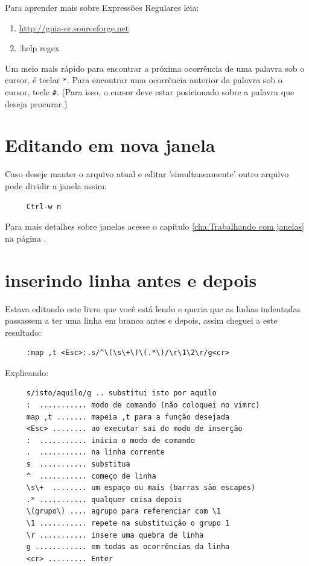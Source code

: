 \documentclass[10pt,a4paper,openany]{book}
\begin{document}
Para aprender mais sobre Expressões Regulares leia:

\begin{enumerate}
  \item \url{http://guia-er.sourceforge.net}
  \item :help regex
\end{enumerate}

Um meio mais rápido para encontrar a próxima ocorrência de
uma palavra sob o cursor, é teclar \verb|*|. Para encontrar uma ocorrência
anterior da palavra sob o cursor, tecle \verb|#|. (Para isso, o cursor deve
estar posicionado sobre a palavra que deseja procurar.)

\section{Editando em nova janela}\label{Editando em nova janela}

Caso deseje manter o arquivo atual e editar 'simultaneamente' outro arquivo
pode dividir a janela assim:

\begin{verbatim}
     Ctrl-w n
\end{verbatim}

Para mais detalhes sobre janelas acesse o capítulo
\ref{cha:Trabalhando com janelas} na página \pageref{cha:Trabalhando
com janelas}.


\section{inserindo linha antes e depois}

Estava editando este livro que você está lendo e queria que as linhas
indentadas passassem a ter uma linha em branco antes e depois, assim cheguei a
este resultado:

\begin{verbatim}
     :map ,t <Esc>:.s/^\(\s\+\)\(.*\)/\r\1\2\r/g<cr>
\end{verbatim}
     
     Explicando:
     
\begin{verbatim}
     s/isto/aquilo/g .. substitui isto por aquilo
     :  ........... modo de comando (não coloquei no vimrc)
     map ,t ....... mapeia ,t para a função desejada
     <Esc> ........ ao executar sai do modo de inserção
     :  ........... inicia o modo de comando
     .  ........... na linha corrente
     s  ........... substitua
     ^  ........... começo de linha
     \s\+  ........ um espaço ou mais (barras são escapes)
     .* ........... qualquer coisa depois
     \(grupo\) .... agrupo para referenciar com \1
     \1 ........... repete na substituição o grupo 1
     \r ........... insere uma quebra de linha
     g ............ em todas as ocorrências da linha
     <cr> ......... Enter
\end{verbatim}
\end{document}
